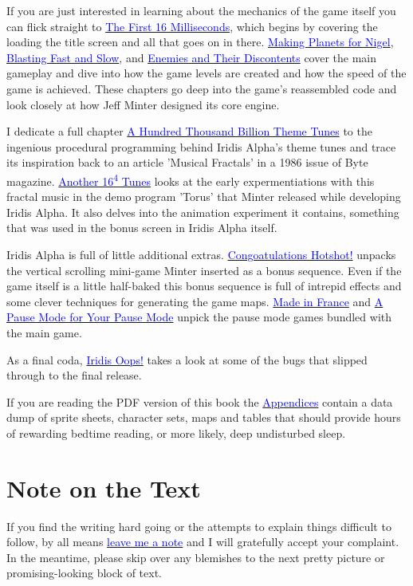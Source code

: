 If you are just interested in learning about the mechanics of the game itself
you can flick straight to \hyperref[sec:first16]{\textcolor{blue}{The First 16
Milliseconds}}, which begins by covering the loading the title
screen and all that goes on in there.
\hyperref[sec:planets]{\textcolor{blue}{Making Planets for Nigel}},
\hyperref[sec:blast]{\textcolor{blue}{Blasting Fast and Slow}}, and
\hyperref[sec:level]{\textcolor{blue}{Enemies and Their Discontents}} cover the
main gameplay and dive into how the game levels are created and how the speed
of the game is achieved. These chapters go deep into the game's reassembled
code and look closely at how Jeff Minter designed its core engine.

I dedicate a full chapter \hyperref[sec:first16]{\textcolor{blue}{A Hundred
Thousand Billion Theme Tunes}} to the ingenious procedural
programming behind Iridis Alpha's theme tunes and trace its inspiration back to
an article 'Musical Fractals' in a 1986 issue of Byte magazine.
\hyperref[sec:torusmusic]{\textcolor{blue}{Another 16\textsuperscript{4}
Tunes}} looks at the early expermentiations with this fractal music in the demo
program 'Torus' that Minter released while developing Iridis Alpha. It also
delves into the animation experiment it contains, something
that was used in the bonus screen in Iridis Alpha itself.

Iridis Alpha is full of little additional extras.
\hyperref[sec:bonus]{\textcolor{blue}{Congoatulations Hotshot!}} unpacks the
vertical scrolling mini-game Minter inserted as a bonus
sequence. Even if the game itself is a little half-baked this
bonus sequence is full of intrepid effects and some clever
techniques for generating the game maps.
\hyperref[sec:mif]{\textcolor{blue}{Made in France}} and
\hyperref[sec:dna]{\textcolor{blue}{A Pause Mode for Your Pause Mode}} unpick
the pause mode games bundled with the main game.

As a final coda, \hyperref[sec:bugs]{\textcolor{blue}{Iridis Oops!}} takes a
look at some of the bugs that slipped through to the final release. 

If you are reading the PDF version of this book the
\hyperref[sec:appendices]{\textcolor{blue}{Appendices}} contain a data dump of
sprite sheets, character sets, maps and tables that should
provide hours of rewarding bedtime reading, or more likely, deep undisturbed
sleep.

\section*{Note on the Text} If you find the writing hard going or the attempts
to explain things difficult to follow, by all means
\href{https://github.com/mwenge/iatheory/issues}{\textcolor{blue}{leave me a
note}} and I will gratefully accept your complaint. In the meantime, please
skip over any blemishes to the next pretty picture or promising-looking block
of text.


